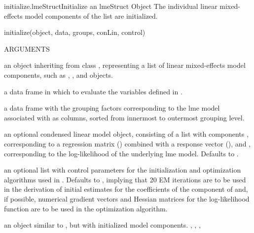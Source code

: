 \documentclass[pdftex]{article} \usepackage{url,graphicx}
\begin{document}
\begin{Helpfile}{initialize.lmeStruct}{Initialize an lmeStruct Object}
The individual linear mixed-effects model components of the
 list are initialized.
\begin{Example}
initialize(object, data, groups, conLin, control)
\end{Example}
\begin{Argument}{ARGUMENTS}
\item[\Co{object:}]
an object inheriting from class ,
representing a list of linear mixed-effects model components, such as
, , and  objects.
\item[\Co{data:}]
a data frame in which to evaluate the variables defined in
.
\item[\Co{groups:}]
a data frame with the grouping factors corresponding to
the lme model associated with  as columns, sorted from
innermost to outermost grouping level.
\item[\Co{conLin:}]
an optional condensed linear model object, consisting of
a list with components , corresponding to a regression
matrix () combined with a response vector (), and 
, corresponding to the log-likelihood of the
underlying lme model. Defaults to .
\item[\Co{control:}]
an optional list with control parameters for the
initialization and optimization algorithms used in
. Defaults to ,
implying that 20 EM iterations are to be used in the derivation of
initial estimates for the coefficients of the 
component of  and, if possible, numerical gradient
vectors and Hessian matrices for the log-likelihood function are to
be used in the optimization algorithm.
\end{Argument}
an  object similar to , but with
initialized model components.
, ,
 , 
\end{Helpfile}
\end{document}
